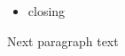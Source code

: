 \documentclass[11pt,a4paper]{article}
\begin{document}
\begin{itemize}
\item closing
\end{itemize}

Next paragraph text

\begin{table}[h]
\begin{tabular}{|l|}
\hline
 \\ \hline
\end{tabular}
\end{table}

\begin{figure}[h]
\end{figure}
\end{document}
